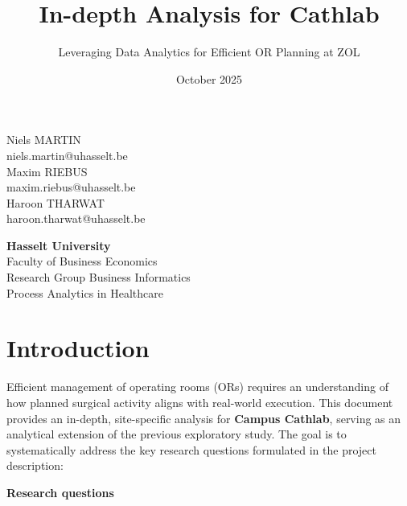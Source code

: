 \documentclass[
]{article}
\title{In-depth Analysis for Cathlab}
\subtitle{Leveraging Data Analytics for Efficient OR Planning at ZOL}
\author{}
\date{\vspace{-2.5em}October 2025}
\begin{document}
\maketitle

\begin{center}
\vspace{2cm}

Niels MARTIN\\
niels.martin@uhasselt.be\\[0.5em]
Maxim RIEBUS\\
maxim.riebus@uhasselt.be\\[0.5em]
Haroon THARWAT\\
haroon.tharwat@uhasselt.be\\

\vspace{6cm}

\textbf{Hasselt University} \\
Faculty of Business Economics \\
Research Group Business Informatics \\
Process Analytics in Healthcare
\end{center}

\newpage
\tableofcontents
\newpage

\section{Introduction}\label{introduction}

Efficient management of operating rooms (ORs) requires an understanding
of how planned surgical activity aligns with real-world execution. This
document provides an in-depth, site-specific analysis for \textbf{Campus
Cathlab}, serving as an analytical extension of the previous exploratory
study. The goal is to systematically address the key research questions
formulated in the project description:

\textbf{Research questions}
\end{document}
